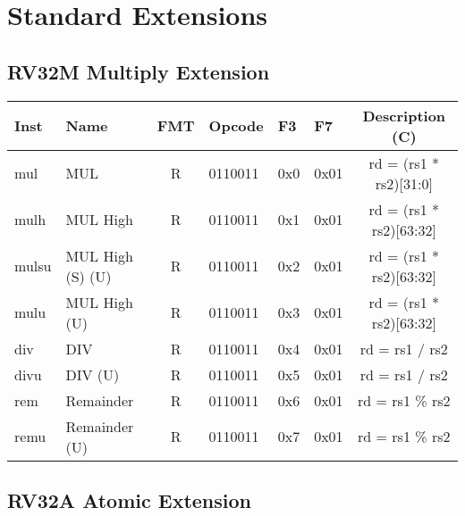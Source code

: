 \section*{Standard Extensions}
\subsection*{RV32M Multiply Extension}
\begin{center}
\begin{tabular}
{T | l | c | T | T | T | C } \hline
\rm Inst & Name              & FMT & \rm Opcode & \rm F3 & \rm F7 & \rm Description (C)     \\ \hline
mul      & MUL               & R   & 0110011    & 0x0    & 0x01   & rd = (rs1 * rs2)[31:0]  \\
mulh     & MUL High          & R   & 0110011    & 0x1    & 0x01   & rd = (rs1 * rs2)[63:32] \\
mulsu    & MUL High (S) (U)  & R   & 0110011    & 0x2    & 0x01   & rd = (rs1 * rs2)[63:32] \\
mulu     & MUL High (U)      & R   & 0110011    & 0x3    & 0x01   & rd = (rs1 * rs2)[63:32] \\
div      & DIV               & R   & 0110011    & 0x4    & 0x01   & rd = rs1 / rs2          \\
divu     & DIV (U)           & R   & 0110011    & 0x5    & 0x01   & rd = rs1 / rs2          \\
rem      & Remainder         & R   & 0110011    & 0x6    & 0x01   & rd = rs1 \% rs2         \\
remu     & Remainder (U)     & R   & 0110011    & 0x7    & 0x01   & rd = rs1 \% rs2         \\
\hline
\end{tabular}
\end{center}

\subsection*{RV32A Atomic Extension}


